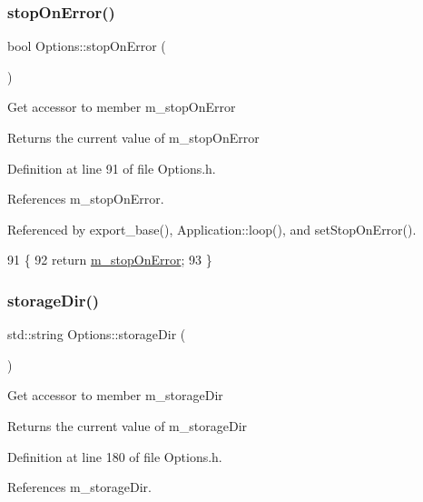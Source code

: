 \subsubsection{\texorpdfstring{stop\+On\+Error()}{stopOnError()}}
{\footnotesize\ttfamily bool Options\+::stop\+On\+Error (\begin{DoxyParamCaption}{ }\end{DoxyParamCaption})\hspace{0.3cm}{\ttfamily [inline]}}

Get accessor to member m\+\_\+stop\+On\+Error \begin{DoxyReturn}{Returns}
the current value of m\+\_\+stop\+On\+Error 
\end{DoxyReturn}


Definition at line 91 of file Options.\+h.



References m\+\_\+stop\+On\+Error.



Referenced by export\+\_\+base(), Application\+::loop(), and set\+Stop\+On\+Error().


\begin{DoxyCode}
91                             \{
92                 \textcolor{keywordflow}{return} \hyperlink{classOptions_a879c2741a290595adb3f74633f3a3987}{m\_stopOnError};
93         \}
\end{DoxyCode}
\mbox{\label{classOptions_a5e8026ed2674f8f5db444b52fea27fda}} 
\subsubsection{\texorpdfstring{storage\+Dir()}{storageDir()}}
{\footnotesize\ttfamily std\+::string Options\+::storage\+Dir (\begin{DoxyParamCaption}{ }\end{DoxyParamCaption})\hspace{0.3cm}{\ttfamily [inline]}}

Get accessor to member m\+\_\+storage\+Dir \begin{DoxyReturn}{Returns}
the current value of m\+\_\+storage\+Dir 
\end{DoxyReturn}


Definition at line 180 of file Options.\+h.



References m\+\_\+storage\+Dir.



